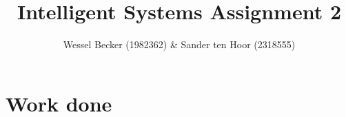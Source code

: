\documentclass[10pt,a4paper]{article}
\begin{document}
\title{Intelligent Systems Assignment 2}
\author{Wessel Becker (1982362) \& Sander ten Hoor (2318555)}
\maketitle

\section{Work done}
\end{document}
